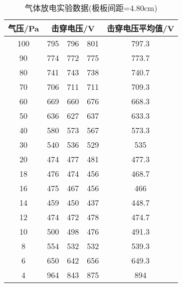 \documentclass[dvipsnames, svgnames,a4paper,11pt]{article}
\begin{document}
	\begin{table}[H]
		\centering
		\begin{tabular}{|c|c|c|c|c|}
			\hline
			气压/Pa & \multicolumn{3}{c|}{击穿电压/V} & 击穿电压平均值/V \\
			\hline
			100 & 795 & 796 & 801 & 797.3 \\
			\hline
			90 & 774 & 772 & 775 & 773.7 \\
			\hline
			80 & 741 & 743 & 738 & 740.7 \\
			\hline
			70 & 706 & 711 & 711 & 709.3 \\
			\hline
			60 & 669 & 660 & 676 & 668.3 \\
			\hline
			50 & 636 & 627 & 637 & 633.3 \\
			\hline
			40 & 580 & 573 & 567 & 573.3 \\
			\hline
			30 & 540 & 536 & 529 & 535 \\
			\hline
			20 & 474 & 477 & 481 & 477.3 \\
			\hline
			18 & 476 & 474 & 456 & 468.7 \\
			\hline
			16 & 475 & 467 & 456 & 466 \\
			\hline
			14 & 459 & 450 & 437 & 448.7 \\
			\hline
			12 & 474 & 472 & 478 & 474.7 \\
			\hline
			10 & 500 & 498 & 476 & 491.3 \\
			\hline
			8 & 554 & 532 & 532 & 539.3 \\
			\hline
			6 & 650 &  642 & 656 & 649.3 \\
			\hline
			4 & 964 & 843 & 875 & 894 \\
 			\hline
		\end{tabular}
		\caption{气体放电实验数据(极板间距=4.80cm)}
		\label{tab：气体放电实验数据(极板间距=4.80cm)}
	\end{table}		
\end{document}
